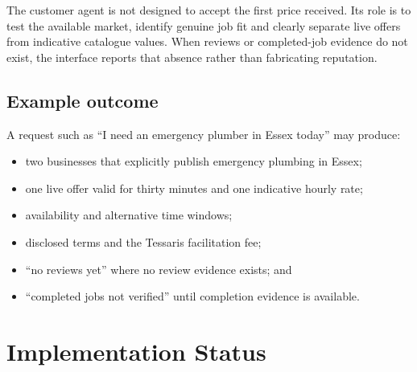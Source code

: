 \documentclass[11pt,a4paper]{article}
\begin{document}
The customer agent is not designed to accept the first price received.  Its
role is to test the available market, identify genuine job fit and clearly
separate live offers from indicative catalogue values.  When reviews or
completed-job evidence do not exist, the interface reports that absence rather
than fabricating reputation.

\subsection{Example outcome}

A request such as ``I need an emergency plumber in Essex today'' may produce:

\begin{itemize}
  \item two businesses that explicitly publish emergency plumbing in Essex;
  \item one live offer valid for thirty minutes and one indicative hourly rate;
  \item availability and alternative time windows;
  \item disclosed terms and the Tessaris facilitation fee;
  \item ``no reviews yet'' where no review evidence exists; and
  \item ``completed jobs not verified'' until completion evidence is available.
\end{itemize}

\section{Implementation Status}
\end{document}

